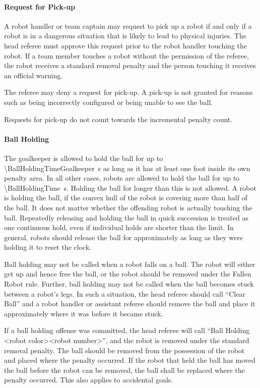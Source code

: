 \paragraph{Request for Pick-up}
\label{sec:request_for_pick_up}

A robot handler or team captain may request to pick up a robot if and only if a robot is in a dangerous situation that is likely to lead to physical injuries. The head referee must approve this request prior to the robot handler touching the robot. If a team member touches a robot without the permission of the referee, the robot receives a standard removal penalty and the person touching it receives an official warning.

The referee may deny a request for pick-up. A pick-up is not granted for reasons such as being incorrectly configured or being unable to see the ball.

Requests for pick-up do not count towards the incremental penalty count.

\paragraph{Ball Holding}
The goalkeeper is allowed to hold the ball for up to \qty{\BallHoldingTimeGoalkeeper}{\second} as long as it has at least one foot inside its own penalty area. In all other cases, robots are allowed to hold the ball for up to \qty{\BallHoldingTime}{\second}. Holding the ball for longer than this is not allowed. A robot is holding the ball, if the convex hull of the robot is covering more than half of the ball. It does not matter whether the offending robot is actually touching the ball. Repeatedly releasing and holding the ball in quick succession is treated as one continuous hold, even if individual holds are shorter than the limit. In general, robots should release the ball for approximately as long as they were holding it to reset the clock. 

Ball holding may not be called when a robot falls on a ball. The robot will either get up and hence free the ball, or the robot should be removed under the Fallen Robot rule. Further, ball holding may not be called when the ball becomes stuck between a robot's legs. In such a situation, the head referee should call ``Clear Ball'' and a robot handler or assistant referee should remove the ball and place it approximately where it was before it became stuck.

If a ball holding offense was committed, the head referee will call ``Ball Holding \textless robot color\textgreater \textless robot number\textgreater'', and the robot is removed under the standard removal penalty. The ball should be removed from the possession of the robot and placed where the penalty occurred. If the robot that held the ball has moved the ball before the robot can be removed, the ball shall be replaced where the penalty occurred. This also applies to accidental goals.

